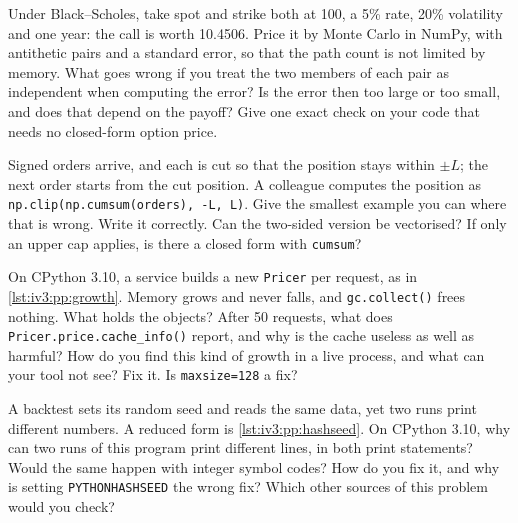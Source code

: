 \begin{question}\label{iq:iv3:python-and-pandas:34}
Under Black--Scholes, take spot and strike both at 100, a 5\% rate, 20\% volatility and one year: the call is worth 10.4506. Price it by Monte Carlo in NumPy, with antithetic pairs and a standard error, so that the path count is not limited by memory. What goes wrong if you treat the two members of each pair as independent when computing the error? Is the error then too large or too small, and does that depend on the payoff? Give one exact check on your code that needs no closed-form option price.
\end{question}

\begin{question}\label{iq:iv3:python-and-pandas:35}
Signed orders arrive, and each is cut so that the position stays within $\pm L$; the next order starts from the cut position. A colleague computes the position as \texttt{np.clip(np.cumsum(orders), -L, L)}. Give the smallest example you can where that is wrong. Write it correctly. Can the two-sided version be vectorised? If only an upper cap applies, is there a closed form with \texttt{cumsum}?
\end{question}

\begin{question}\label{iq:iv3:python-and-pandas:36}
On CPython 3.10, a service builds a new \texttt{Pricer} per request, as in \cref{lst:iv3:pp:growth}. Memory grows and never falls, and \texttt{gc.collect()} frees nothing. What holds the objects? After 50 requests, what does \texttt{Pricer.price.cache\_info()} report, and why is the cache useless as well as harmful? How do you find this kind of growth in a live process, and what can your tool not see? Fix it. Is \texttt{maxsize=128} a fix?
\label{lst:iv3:pp:growth}
\end{question}

\begin{question}\label{iq:iv3:python-and-pandas:37}
A backtest sets its random seed and reads the same data, yet two runs print different numbers. A reduced form is \cref{lst:iv3:pp:hashseed}. On CPython 3.10, why can two runs of this program print different lines, in both print statements? Would the same happen with integer symbol codes? How do you fix it, and why is setting \texttt{PYTHONHASHSEED} the wrong fix? Which other sources of this problem would you check?
\label{lst:iv3:pp:hashseed}
\end{question}

